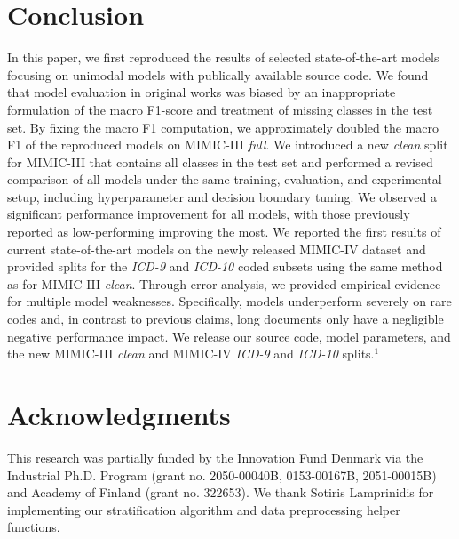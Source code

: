 {\section{Conclusion}
In this paper, we first reproduced the results of selected state-of-the-art models focusing on unimodal models with publically available source code. 
We found that model evaluation in original works was biased by an inappropriate formulation of the macro F1-score and treatment of missing classes in the test set. By fixing the macro F1 computation, we approximately doubled the macro F1 of the reproduced models on MIMIC-III \textit{full}. 
We introduced a new \textit{clean} split for MIMIC-III that contains all classes in the test set and performed a revised comparison of all models under the same training, evaluation, and experimental setup, including hyperparameter and decision boundary tuning. We observed a significant performance improvement for all models, with those previously reported as low-performing improving the most. 
We reported the first results of current state-of-the-art models on the newly released MIMIC-IV dataset \parencite{johnsonMIMICIVFreelyAccessible2023, goldbergerPhysioBankPhysioToolkitPhysioNet2000} and provided splits for the \textit{ICD-9} and \textit{ICD-10} coded subsets using the same method as for MIMIC-III \textit{clean}.
Through error analysis, we provided empirical evidence for multiple model weaknesses. Specifically, models underperform severely on rare codes 
and, in contrast to previous claims, long documents only have a negligible negative performance impact. 
We release our source code, model parameters, and the new MIMIC-III \textit{clean} and MIMIC-IV \textit{ICD-9} and \textit{ICD-10} splits.$^\text{1}$

\section*{Acknowledgments}
This research was partially funded by the Innovation Fund Denmark via the Industrial Ph.D. Program (grant no. 2050-00040B, 0153-00167B, 2051-00015B) and Academy of Finland (grant no. 322653).
We thank Sotiris Lamprinidis for implementing our stratification algorithm and data preprocessing helper functions.
   
}
